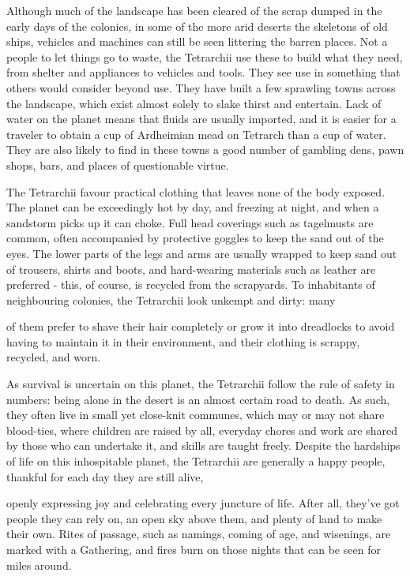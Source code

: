 \documentclass{scrbook}
\begin{document}
Although much of the landscape has been cleared of the scrap dumped in the early days of the colonies, in some of the more arid deserts the skeletons of old ships, vehicles and machines can still be seen littering the barren places. Not a people to let things go to waste, the Tetrarchii use these to build what they need, from shelter and appliances to vehicles and tools. They see use in something that others would consider beyond use. They have built a few sprawling towns across the landscape, which exist almost solely to slake thirst and entertain. Lack of water on the planet means that fluids are usually imported, and it is easier for a traveler to obtain a cup of Ardheimian mead on Tetrarch than a cup of water. They are also likely to find in these towns a good number of gambling dens, pawn shops, bars, and places of questionable virtue.

The Tetrarchii favour practical clothing that leaves none of the body exposed. The planet can be exceedingly hot by day, and freezing at night, and when a sandstorm picks up it can choke. Full head coverings such as tagelmusts are common, often accompanied by protective goggles to keep the sand out of the eyes. The lower parts of the legs and arms are usually wrapped to keep sand out of trousers, shirts and boots, and hard-wearing materials such as leather are preferred - this, of course, is recycled from the scrapyards. To inhabitants of neighbouring colonies, the Tetrarchii look unkempt and dirty: many

of them prefer to shave their hair completely or grow it into dreadlocks to avoid having to maintain it in their environment, and their clothing is scrappy, recycled, and worn.

As survival is uncertain on this planet, the Tetrarchii follow the rule of safety in numbers: being alone in the desert is an almost certain road to death. As such, they often live in small yet close-knit communes, which may or may not share blood-ties, where children are raised by all, everyday chores and work are shared by those who can undertake it, and skills are taught freely. Despite the hardships of life on this inhospitable planet, the Tetrarchii are generally a happy people, thankful for each day they are still alive,

openly expressing joy and celebrating every juncture of life. After all, they've got people they can rely on, an open sky above them, and plenty of land to make their own. Rites of passage, such as namings, coming of age, and wisenings, are marked with a Gathering, and fires burn on those nights that can be seen for miles around.
\end{document}
